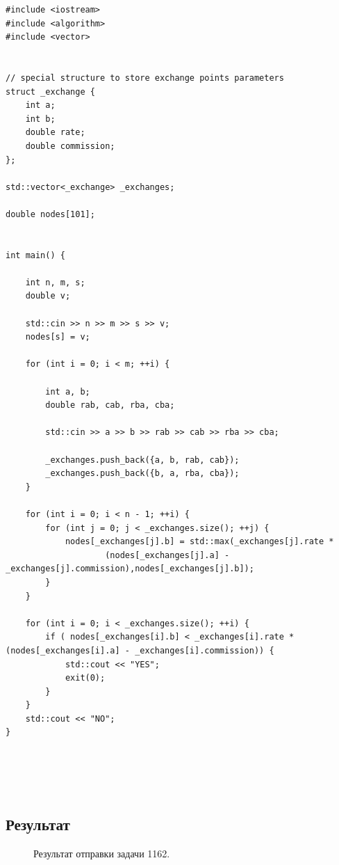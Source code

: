 \documentclass[a5paper, 10pt]{article}
\theoremstyle{definition}
\theoremstyle{plain}
\theoremstyle{remark}
\begin{document}
\begin{center}
\begin{lstlisting}[label=some-code,caption={Исходный код для 1162}]
#include <iostream>
#include <algorithm>
#include <vector>


// special structure to store exchange points parameters
struct _exchange {
    int a;
    int b;
    double rate;
    double commission;
};

std::vector<_exchange> _exchanges;

double nodes[101];


int main() {

    int n, m, s;
    double v;

    std::cin >> n >> m >> s >> v;
    nodes[s] = v;

    for (int i = 0; i < m; ++i) {

        int a, b;
        double rab, cab, rba, cba;

        std::cin >> a >> b >> rab >> cab >> rba >> cba;

        _exchanges.push_back({a, b, rab, cab});
        _exchanges.push_back({b, a, rba, cba});
    }

    for (int i = 0; i < n - 1; ++i) {
        for (int j = 0; j < _exchanges.size(); ++j) {
            nodes[_exchanges[j].b] = std::max(_exchanges[j].rate * 
                    (nodes[_exchanges[j].a] - _exchanges[j].commission),nodes[_exchanges[j].b]);
        }
    }

    for (int i = 0; i < _exchanges.size(); ++i) {
        if ( nodes[_exchanges[i].b] < _exchanges[i].rate * (nodes[_exchanges[i].a] - _exchanges[i].commission)) {
            std::cout << "YES";
            exit(0);
        }
    }
    std::cout << "NO";
}





\end{lstlisting}
\end{center}

\subsection{Результат}
\begin{figure}[h!]
\caption{Результат отправки задачи 1162.}
\end{figure}
\end{document}
